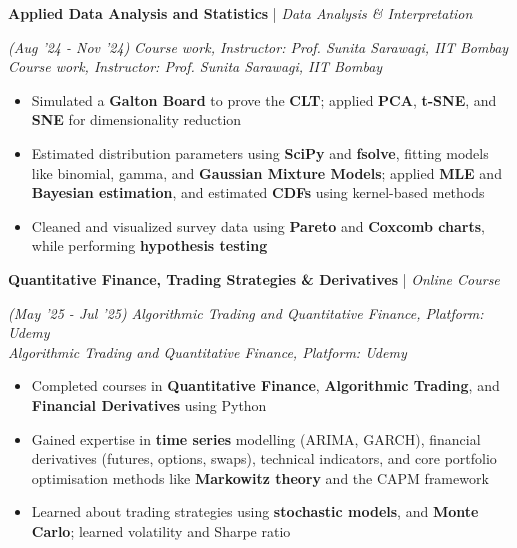 \documentclass[10pt]{article}
\renewcommand{\subsection}[4]{
	\def\temp{#4}
	\vspace{2pt}
	{
		\large
		{\color{Green} \textbf{#1}} | {\sl #2} \filldate{#3}
		\ifx\temp\empty
		\else
		{
			\\[0.098em]
			\fontsize{10.5}{13.2}\selectfont
			\sl #4
		}
		\fi
	}
}
\newcommand{\filldate}[1]{\strut\hfill {\small \textit{(#1)}}}
\begin{document}
\vspace{-2px}

\subsection{Applied Data Analysis and Statistics}{Data Analysis \& Interpretation}{Aug '24 - Nov '24}{\textit{Course work, Instructor: Prof. Sunita Sarawagi, IIT Bombay}}  
\begin{itemize}
    \item Simulated a \textbf{Galton Board} to prove the \textbf{CLT}; applied \textbf{PCA}, \textbf{t-SNE}, and \textbf{SNE} for dimensionality reduction
    \item Estimated distribution parameters using \textbf{SciPy} and \textbf{fsolve}, fitting models like binomial, gamma, and \textbf{Gaussian Mixture Models}; applied \textbf{MLE} and \textbf{Bayesian estimation}, and estimated \textbf{CDFs} using kernel-based methods
    \item Cleaned and visualized survey data using \textbf{Pareto} and \textbf{Coxcomb charts}, while performing \textbf{hypothesis testing}
\end{itemize}

\vspace{-2px}

\subsection{Quantitative Finance, Trading Strategies \& Derivatives}{Online Course}{May '25 - Jul '25}{\textit{Algorithmic Trading and Quantitative Finance, Platform: Udemy}}
\begin{itemize}
\item Completed courses in \textbf{Quantitative Finance}, \textbf{Algorithmic Trading}, and \textbf{Financial Derivatives} using Python  
\item Gained expertise in \textbf{time series} modelling (ARIMA, GARCH), financial derivatives (futures, options, swaps), technical indicators, and core portfolio optimisation methods like \textbf{Markowitz theory} and the CAPM framework
\item Learned about trading strategies using \textbf{stochastic models}, and \textbf{Monte Carlo}; learned volatility and Sharpe ratio
\end{itemize}


\vspace{-14px}
\end{document}
